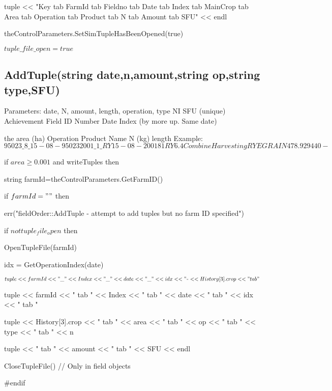 \documentclass[%
]{scrartcl}
\begin{document}
{{     \quad   tuple << "Key tab FarmId tab Fieldno tab Date tab Index tab MainCrop tab Area tab Operation tab Product tab N tab Amount tab SFU" << endl
     
     \quad   theControlParameters.SetSimTupleHasBeenOpened(true)
   
   
   $tuple\_file\_open=true$





\subsection{AddTuple(string date,n,amount,string op,string type,SFU)}

Parameters: date, N, amount, length, operation, type
NI SFU (unique) Achievement Field ID Number Date Index (by more up. Same date)

the area (ha) Operation Product Name N (kg)
length 
Example:$ 95023\_8\_15-08-95023 2001\_1\_RY 15-08-2001
 8 1 RY 6.4 Combine Harvesting RYEGRAIN 478.9 29 440 -$


   if $area\ge 0.001$ and writeTuples then
   
   \quad    string farmId=theControlParameters.GetFarmID()
      
   \quad    if $farmId=""$ then
      
   \quad     \quad   err("fieldOrder::AddTuple - attempt to add tuples but no farm ID specified")
       
    \quad   if $ not tuple_file_open$ then
      
      \quad    OpenTupleFile(farmId)
         
   \quad     idx = GetOperationIndex(date)
     
     \quad  $tuple << farmId << "\_" << Index << "\_" << 
 date << "\_" << idx << "_" << History[3].crop << " tab "$
      
      \quad  tuple << farmId << " tab " << Index << " tab "
 << date << " tab " << idx << " tab "
     
     \quad  tuple << History[3].crop << " tab " << area 
<< " tab " << op << " tab " << type << " tab " << n
     
     \quad  tuple << " tab " << amount << " tab " << SFU << endl
  
    \quad   CloseTupleFile()  // Only in field objects
   

\#endif





}}
\end{document}

